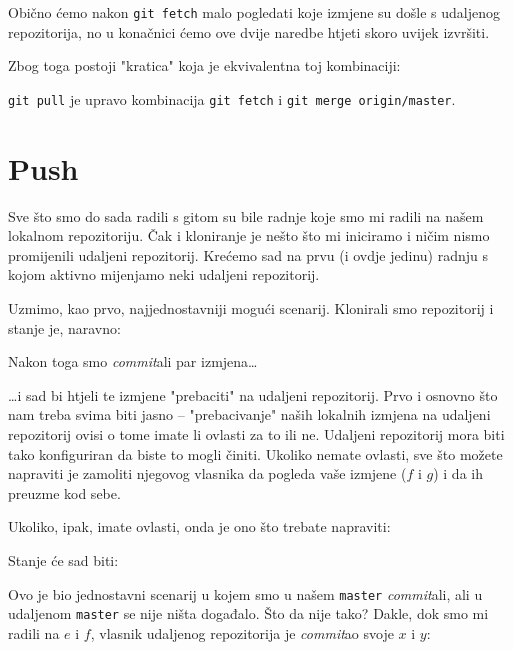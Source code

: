 Obično ćemo nakon \verb+git fetch+ malo pogledati koje izmjene su došle s udaljenog repozitorija, no u konačnici ćemo ove dvije naredbe htjeti skoro uvijek izvršiti.

Zbog toga postoji "kratica" koja je ekvivalentna toj kombinaciji:


\verb+git pull+ je upravo kombinacija \verb+git fetch+ i \verb+git merge origin/master+.

\section*{Push}

Sve što smo do sada radili s gitom su bile radnje koje smo mi radili na našem lokalnom repozitoriju.
Čak i kloniranje je nešto što mi iniciramo i ničim nismo promijenili udaljeni repozitorij.
Krećemo sad na prvu (i ovdje jedinu) radnju s kojom aktivno mijenjamo neki udaljeni repozitorij.

Uzmimo, kao prvo, najjednostavniji mogući scenarij.
Klonirali smo repozitorij i stanje je, naravno:



Nakon toga smo \emph{commit}ali par izmjena\dots



\dots{}i sad bi htjeli te izmjene "prebaciti" na udaljeni repozitorij.
Prvo i osnovno što nam treba svima biti jasno -- "prebacivanje" naših lokalnih izmjena na udaljeni repozitorij ovisi o tome imate li ovlasti za to ili ne.
Udaljeni repozitorij mora biti tako konfiguriran da biste to mogli činiti.
Ukoliko nemate ovlasti, sve što možete napraviti je zamoliti njegovog vlasnika da pogleda vaše izmjene ($f$ i $g$) i da ih preuzme kod sebe.

Ukoliko, ipak, imate ovlasti, onda je ono što trebate napraviti:



Stanje će sad biti:



Ovo je bio jednostavni scenarij u kojem smo u našem \verb+master+ \emph{commit}ali, ali u udaljenom \verb+master+ se nije ništa događalo.
Što da nije tako?
Dakle, dok smo mi radili na $e$ i $f$, vlasnik udaljenog repozitorija je \emph{commit}ao svoje $x$ i $y$:



